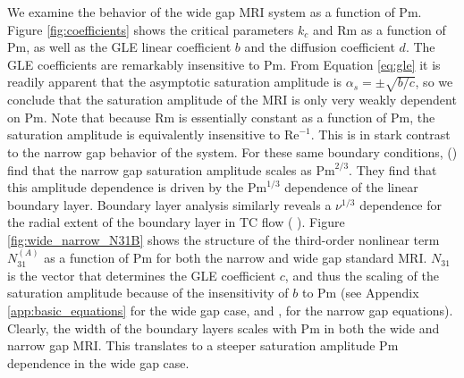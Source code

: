 \documentclass{emulateapj}
\newcommand{\citei}[1]{\citeauthor{#1} \citeyear{#1}}
\newcommand\reye{\mathrm{Re}}
\newcommand\reym{\mathrm{Rm}}
\newcommand{\Pm}{\mathrm{Pm}}
\begin{document}
We examine the behavior of the wide gap MRI system as a function of $\Pm$. Figure \ref{fig:coefficients} shows the critical parameters $k_c$ and $\reym$ as a function of $\Pm$, as well as the GLE linear coefficient $b$ and the diffusion coefficient $d$. The GLE coefficients are remarkably insensitive to $\Pm$. From Equation \ref{eq:gle} it is readily apparent that the asymptotic saturation amplitude is $\alpha_{s} = \pm \sqrt{b/c}$, so we conclude that the saturation amplitude of the MRI is only very weakly dependent on $\Pm$. Note that because $\reym$ is essentially constant as a function of $\Pm$, the saturation amplitude is equivalently insensitive to $\reye^{-1}$. This is in stark contrast to the narrow gap behavior of the system. For these same boundary conditions, \citeauthor{Umurhan:2007hs} (\citeyear{Umurhan:2007hs}) find that the narrow gap saturation amplitude scales as $\Pm^{2/3}$. They find that this amplitude dependence is driven by the $\Pm^{1/3}$ dependence of the linear boundary layer. Boundary layer analysis similarly reveals a $\nu^{1/3}$ dependence for the radial extent of the boundary layer in TC flow (\citei{Goodman:2002ix}). %
Figure \ref{fig:wide_narrow_N31B} shows the structure of the third-order nonlinear term $N_{31}^{(A)}$ as a function of $\Pm$ for both the narrow and wide gap standard MRI. $N_{31}$ is the vector that determines the GLE coefficient $c$, and thus the scaling of the saturation amplitude because of the insensitivity of $b$ to $\Pm$ (see Appendix \ref{app:basic_equations} for the wide gap case, and \citei{Umurhan:2007hs}, \citei{Clark:2016} for the narrow gap equations). Clearly, the width of the boundary layers scales with $\Pm$ in both the wide and narrow gap MRI. This translates to a steeper saturation amplitude $\Pm$ dependence in the wide gap case.%

\end{document}
